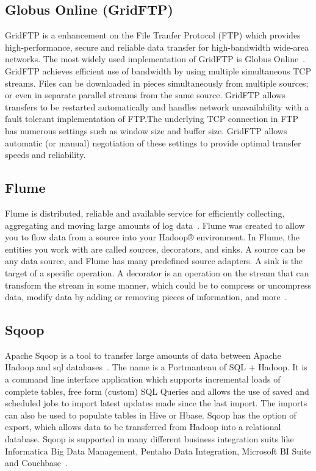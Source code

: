 {     \pv

\subsection{Globus Online (GridFTP)}

GridFTP is a enhancement on the File Tranfer Protocol (FTP) which
provides high-performance, secure and reliable data transfer for
high-bandwidth wide-area networks. The most widely used implementation
of GridFTP is Globus Online~\cite{www-GlobusOnline}. GridFTP achieves
efficient use of bandwidth by using multiple simultaneous TCP streams.
Files can be downloaded in pieces simultaneously from multiple
sources; or even in separate parallel streams from the same
source. GridFTP allows transfers to be restarted automatically and
handles network unavailability with a fault tolerant implementation of
FTP.The underlying TCP connection in FTP has numerous settings such as
window size and buffer size. GridFTP allows automatic (or manual)
negotiation of these settings to provide optimal transfer speeds and
reliability.

     \pv


\subsection{Flume}

Flume is distributed, reliable and available service for efficiently
collecting, aggregating and moving large amounts of log
data~\cite{apache-flume}. Flume was created to allow you to flow data
from a source into your Hadoop® environment.  In Flume, the entities
you work with are called sources, decorators, and sinks. A source can
be any data source, and Flume has many predefined source adapters. A
sink is the target of a specific operation. A decorator is an
operation on the stream that can transform the stream in some manner,
which could be to compress or uncompress data, modify data by adding
or removing pieces of information, and more~\cite{ibm-flume}.

\subsection{Sqoop}
     
Apache Sqoop is a tool to transfer large amounts of data between
Apache Hadoop and sql databases~\cite{www-sqoop}. The name is a
Portmanteau of SQL + Hadoop. It is a command line interface
application which supports incremental loads of complete tables, free
form (custom) SQL Queries and allows the use of saved and scheduled
jobs to import latest updates made since the last import. The imports
can also be used to populate tables in Hive or Hbase. Sqoop has the
option of export, which allows data to be transferred from Hadoop into
a relational database. Sqoop is supported in many different business
integration suits like Informatica Big Data Management, Pentaho Data
Integration, Microsoft BI Suite and Couchbase~\cite{sqoop-wiki}.

}
